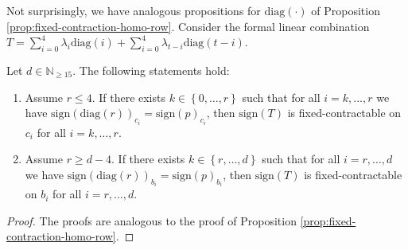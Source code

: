 Not surprisingly, we have analogous propositions for \( \mathrm{diag}(\cdot) \) of Proposition \ref{prop:fixed-contraction-homo-row}. Consider the formal linear combination \(  T = \sum_{i=0}^{4}  \lambda_{i} \mathrm{diag}(i) + \sum_{i=0}^{4}  \lambda_{t-i} \mathrm{diag}(t-i) \).

\begin{proposition}\label{prop:fixed-contraction-homo-diag}
    Let \( d \in \mathbb{N}_{\geq 15} \). The following statements hold:
    \begin{enumerate}
        \item  Assume \( r \leq 4 \). If there exists \( k \in \left\{ 0, \dots, r \right\} \) such that for all \( i = k, \dots, r\) we have \(  \mathrm{sign}(\mathrm{diag}(r))_{c_i} = \mathrm{sign}(p)_{c_i} \),
        then  \( \mathrm{sign}(T) \) is fixed-contractable on \( c_i \) for all \( i = k, \dots, r \).
        \item Assume \( r \geq d-4 \).
        If there exists \( k \in \left\{ r, \dots, d \right\} \) such that for all \( i = r, \dots, d\) we have \(  \mathrm{sign}(\mathrm{diag}(r))_{b_i} = \mathrm{sign}(p)_{b_i} \),
        then  \( \mathrm{sign}(T) \) is fixed-contractable on \( b_i \) for all \( i = r, \dots, d \).
    \end{enumerate}
\end{proposition}

\begin{proof}
    The proofs are analogous to the proof of Proposition \ref{prop:fixed-contraction-homo-row}.
\end{proof}





